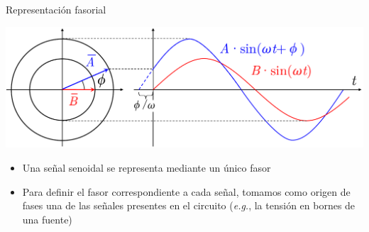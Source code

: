 \documentclass[aspectratio=169, usenames,svgnames,dvipsnames]{beamer}
\begin{document}
\begin{frame}{Representación fasorial}

    \begin{center}
        \includegraphics[height=0.45\textheight]{../figs/Fasor_definicion.pdf}
    \end{center}
    
    \begin{itemize}
        \item Una señal senoidal \alert{se representa mediante un único fasor}    

        \vspace{3mm}
        \item Para definir el fasor correspondiente a cada señal, tomamos como origen de fases una de las señales presentes en el circuito (\textit{e.g.}, la tensión en bornes de una fuente)                
    \end{itemize}   

\end{frame}

\end{document}
